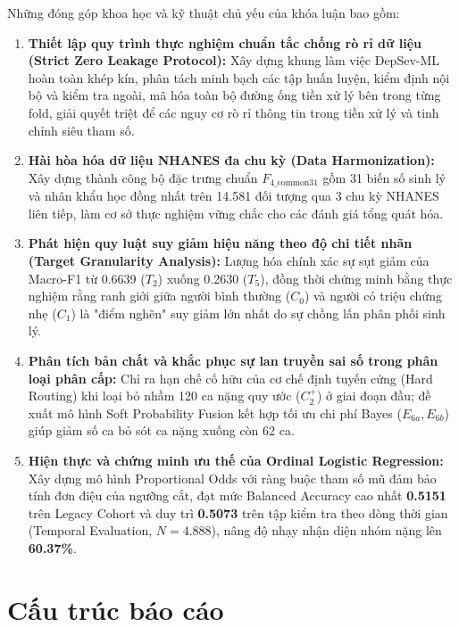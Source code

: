Những đóng góp khoa học và kỹ thuật chủ yếu của khóa luận bao gồm:
\begin{enumerate}
    \item \textbf{Thiết lập quy trình thực nghiệm chuẩn tắc chống rò rỉ dữ liệu (Strict Zero Leakage Protocol):} Xây dựng khung làm việc DepSev-ML hoàn toàn khép kín, phân tách minh bạch các tập huấn luyện, kiểm định nội bộ và kiểm tra ngoài, mã hóa toàn bộ đường ống tiền xử lý bên trong từng fold, giải quyết triệt để các nguy cơ rò rỉ thông tin trong tiền xử lý và tinh chỉnh siêu tham số.
    \item \textbf{Hài hòa hóa dữ liệu NHANES đa chu kỳ (Data Harmonization):} Xây dựng thành công bộ đặc trưng chuẩn $F_{4\_\text{common31}}$ gồm 31 biến số sinh lý và nhân khẩu học đồng nhất trên 14.581 đối tượng qua 3 chu kỳ NHANES liên tiếp, làm cơ sở thực nghiệm vững chắc cho các đánh giá tổng quát hóa.
    \item \textbf{Phát hiện quy luật suy giảm hiệu năng theo độ chi tiết nhãn (Target Granularity Analysis):} Lượng hóa chính xác sự sụt giảm của Macro-F1 từ 0.6639 ($T_2$) xuống 0.2630 ($T_5$), đồng thời chứng minh bằng thực nghiệm rằng ranh giới giữa người bình thường ($C_0$) và người có triệu chứng nhẹ ($C_1$) là "điểm nghẽn" suy giảm lớn nhất do sự chồng lấn phân phối sinh lý.
    \item \textbf{Phân tích bản chất và khắc phục sự lan truyền sai số trong phân loại phân cấp:} Chỉ ra hạn chế cố hữu của cơ chế định tuyến cứng (Hard Routing) khi loại bỏ nhầm 120 ca nặng quy ước ($C_2^+$) ở giai đoạn đầu; đề xuất mô hình Soft Probability Fusion kết hợp tối ưu chi phí Bayes ($E_{6a}, E_{6b}$) giúp giảm số ca bỏ sót ca nặng xuống còn 62 ca.
    \item \textbf{Hiện thực và chứng minh ưu thế của Ordinal Logistic Regression:} Xây dựng mô hình Proportional Odds với ràng buộc tham số mũ đảm bảo tính đơn điệu của ngưỡng cắt, đạt mức Balanced Accuracy cao nhất \textbf{0.5151} trên Legacy Cohort và duy trì \textbf{0.5073} trên tập kiểm tra theo dòng thời gian (Temporal Evaluation, $N = 4.888$), nâng độ nhạy nhận diện nhóm nặng lên \textbf{60.37\%}.
\end{enumerate}

\section{Cấu trúc báo cáo}
\label{sec:cau-truc-bao-cao}

